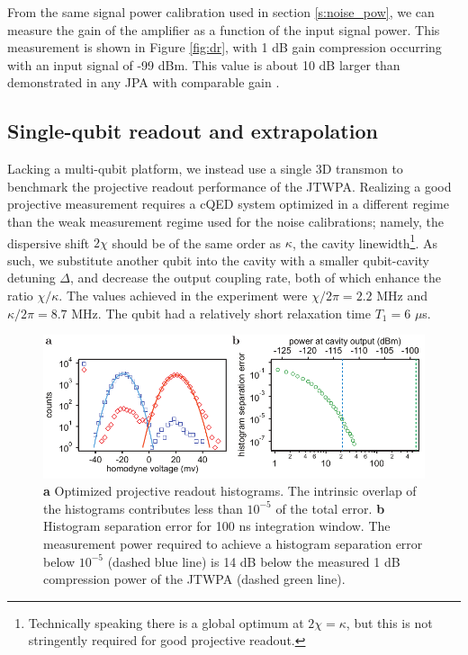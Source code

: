 From the same signal power calibration used in section \ref{s:noise_pow}, we can measure the gain of the amplifier as a function of the input signal power.  This measurement is shown in Figure \ref{fig:dr}, with 1 dB gain compression occurring with an input signal of -99 dBm.  This value is about 10 dB larger than demonstrated in any JPA with comparable gain \cite{Eichler2014a,Mutus2014}.

\subsection{Single-qubit readout and extrapolation}\label{s:twpa_proj_meas}

Lacking a multi-qubit platform, we instead use a single 3D transmon to benchmark the projective readout performance of the JTWPA.  Realizing a good projective measurement requires a cQED system optimized in a different regime than the weak measurement regime used for the noise calibrations; namely, the dispersive shift $2\chi$ should be of the same order as $\kappa$, the cavity linewidth\footnote{Technically speaking there is a global optimum at $2\chi = \kappa$, but this is not stringently required for good projective readout.}.  As such, we substitute another qubit into the cavity with a smaller qubit-cavity detuning $\Delta$, and decrease the output coupling rate, both of which enhance the ratio $\chi/\kappa$.  The values achieved in the experiment were $\chi/2\pi = 2.2$ MHz and $\kappa/2\pi = 8.7$ MHz.  The qubit had a relatively short relaxation time $T_1 = 6$ $\mu$s.

\begin{figure}
\begin{center}
\includegraphics[width=5.42in]{twpa_exp/proj_meas}
\end{center}
\caption[Projective qubit measurement with JTWPA]{\textbf{a} Optimized projective readout histograms.  The intrinsic overlap of the histograms contributes less than $10^{-5}$ of the total error.  \textbf{b} Histogram separation error for 100 ns integration window.  The measurement power required to achieve a histogram separation error below $10^{-5}$ (dashed blue line) is 14 dB below the measured 1 dB compression power of the JTWPA (dashed green line).}
\label{fig:proj_meas}
\end{figure}

